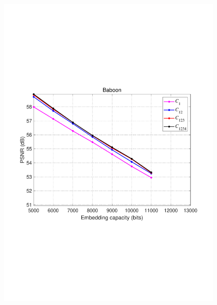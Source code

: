 \documentclass[review,3p,10pt,sort&compress]{elsarticle}
\begin{document}
\begin{figure}
{\begin{minipage}[t]{0.46\linewidth}
\includegraphics[width=1\textwidth]{figures/Result/size/Baboon.pdf}
\end{minipage}
}


\end{figure}
\end{document}
